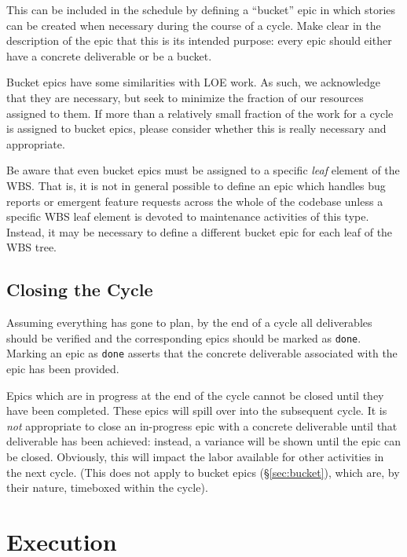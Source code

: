 This can be included in the schedule by defining a ``bucket'' \gls{epic} in which stories can be created when necessary during the course of a \gls{cycle}.
Make clear in the description of the \gls{epic} that this is its intended purpose: every \gls{epic} should either have a concrete deliverable or be a bucket.

Bucket \glspl{epic} have some similarities with \gls{LOE} work.
As such, we acknowledge that they are necessary, but seek to minimize the fraction of our resources assigned to them.
If more than a relatively small fraction of the work for a \gls{cycle} is assigned to bucket \glspl{epic}, please consider whether this is really necessary and appropriate.

Be aware that even bucket \glspl{epic} must be assigned to a specific \emph{leaf} \gls{element} of the \gls{WBS}.
That is, it is not in general possible to define an \gls{epic} which handles bug reports or emergent feature requests across the whole of the codebase unless a specific \gls{WBS} leaf \gls{element} is devoted to maintenance activities of this type.
Instead, it may be necessary to define a different bucket \gls{epic} for each leaf of the \gls{WBS} tree.


\subsection{Closing the Cycle}
\label{sec:cycle-close}

Assuming everything has gone to plan, by the end of a \gls{cycle} all deliverables should be verified and the corresponding \glspl{epic} should be marked as \texttt{done}.
Marking an \gls{epic} as \texttt{done} asserts that the concrete deliverable associated with the \gls{epic} has been provided.

Epics which are in progress at the end of the \gls{cycle} cannot be closed until they have been completed.
These \glspl{epic} will spill over into the subsequent \gls{cycle}.
It is \emph{not} appropriate to close an in-progress \gls{epic} with a concrete deliverable until that deliverable has been achieved: instead, a variance will be shown until the \gls{epic} can be closed.
Obviously, this will impact the labor available for other activities in the next \gls{cycle}.
(This does not apply to bucket \glspl{epic} (\S\ref{sec:bucket}), which are, by their nature, \gls{timebox}ed within the \gls{cycle}).


\section{Execution}
\label{sec:execution}

